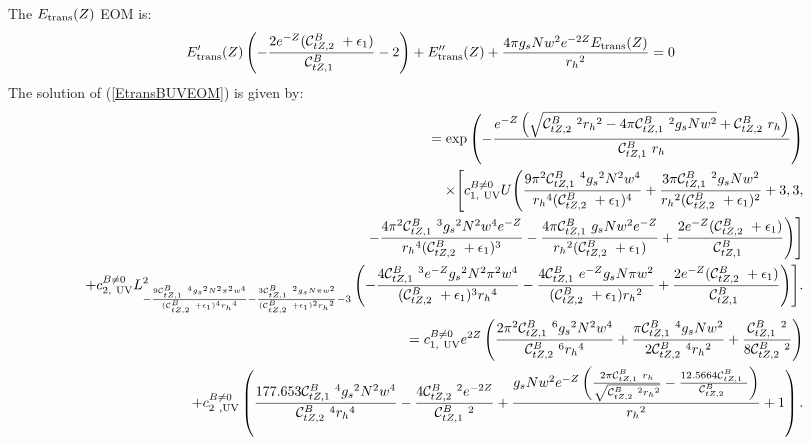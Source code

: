 The $E_{\rm trans}(Z)$ EOM is:
\begin{eqnarray}
\label{EtransBUVEOM}
& & E_{\rm trans}'(Z) \left(-\frac{2 e^{-Z}
   ({\cal C}_{tZ,2}^B\ +{\epsilon_1})}{{\cal C}_{tZ,1}^B\ }-2\right)+E_{\rm trans}''(Z)+\frac{4 \pi  {g_s} N w^2 e^{-2
   Z} E_{\rm trans}(Z)}{{r_h}^2}=0 \quad\quad
\end{eqnarray}
The solution of (\ref{EtransBUVEOM}) is given by:
{\scriptsize
\begin{eqnarray}
\label{EtransBUVsol-i}
& & = \exp \left(-\frac{e^{-Z} \left(\sqrt{{\cal C}_{tZ,2}^B\ ^2 {r_h}^2-4 \pi  {\cal C}_{tZ,1}^B\ ^2
   {g_s} N w^2}+{\cal C}_{tZ,2}^B\  {r_h}\right)}{{\cal C}_{tZ,1}^B\  {r_h}}\right)\nonumber\\
 & & \quad \times  \Biggl[c_{1,\ \rm UV}^{B\neq0}U\Biggl(\frac{9 \pi ^2 {\cal C}_{tZ,1}^B\ ^4 {g_s}^2 N^2 w^4}{{r_h}^4
   ({\cal C}_{tZ,2}^B\ +{\epsilon_1})^4}+\frac{3 \pi  {\cal C}_{tZ,1}^B\ ^2 {g_s} N
w^2}{{r_h}^2 ({\cal C}_{tZ,2}^B\ +{\epsilon_1})^2}+3,3,\nonumber \\ & & \quad-\frac{4 \pi ^2
   {\cal C}_{tZ,1}^B\ ^3 {g_s}^2 N^2 w^4 e^{-Z}}{{r_h}^4
   ({\cal C}_{tZ,2}^B\ +{\epsilon_1})^3}-\frac{4 \pi  {\cal C}_{tZ,1}^B\  {g_s} N w^2
   e^{-Z}}{{r_h}^2 ({\cal C}_{tZ,2}^B\ +{\epsilon_1})}+\frac{2 e^{-Z}
   ({\cal C}_{tZ,2}^B\ +{\epsilon_1})}{{\cal C}_{tZ,1}^B\ }\Biggl)\Biggr]\nonumber\\
& & + c_{2,\ \rm UV}^{B\neq0} L_{-\frac{9 {\cal C}_{tZ,1}^B\ ^4 {g_s}^2 N^2 \pi ^2
   w^4}{({\cal C}_{tZ,2}^B\ +{\epsilon_1})^4 {r_h}^4}-\frac{3 {\cal C}_{tZ,1}^B\ ^2 {g_s}
   N \pi  w^2}{({\cal C}_{tZ,2}^B\ +{\epsilon_1})^2 {r_h}^2}-3}^2\left(-\frac{4
   {\cal C}_{tZ,1}^B\ ^3 e^{-Z} {g_s}^2 N^2 \pi ^2 w^4}{({\cal C}_{tZ,2}^B\ +{\epsilon_1})^3
   {r_h}^4}-\frac{4 {\cal C}_{tZ,1}^B\  e^{-Z} {g_s} N \pi 
   w^2}{({\cal C}_{tZ,2}^B\ +{\epsilon_1}) {r_h}^2}+\frac{2 e^{-Z}
   ({\cal C}_{tZ,2}^B\ +{\epsilon_1})}{{\cal C}_{tZ,1}^B\ }\right) \Biggr].\nonumber\\
& & = c_{1,\ \rm UV}^{B\neq0} e^{2 Z} \left(\frac{2 \pi ^2 {\cal C}_{tZ,1}^B\ ^6 {g_s}^2 N^2 w^4}{{\cal C}_{tZ,2}^B\ ^6
   {r_h}^4}+\frac{\pi  {\cal C}_{tZ,1}^B\ ^4 {g_s} N w^2}{2 {\cal C}_{tZ,2}^B\ ^4
   {r_h}^2}+\frac{{\cal C}_{tZ,1}^B\ ^2}{8 {\cal C}_{tZ,2}^B\ ^2}\right)\nonumber\\
& & + c_{2\ ,\rm UV}^{B\neq0} \left(\frac{177.653 {\cal C}_{tZ,1}^B\ ^4 {g_s}^2 N^2 w^4}{{\cal C}_{tZ,2}^B\ ^4
   {r_h}^4}-\frac{4 {\cal C}_{tZ,2}^B\ ^2 e^{-2 Z}}{{\cal C}_{tZ,1}^B\ ^2}+\frac{{g_s} N w^2
   e^{-Z} \left(\frac{2 \pi  {\cal C}_{tZ,1}^B\  {r_h}}{\sqrt{{\cal C}_{tZ,2}^B\ ^2
   {r_h}^2}}-\frac{12.5664
   {\cal C}_{tZ,1}^B\ }{{\cal C}_{tZ,2}^B\ }\right)}{{r_h}^2}+1\right).         
\end{eqnarray}   
}

